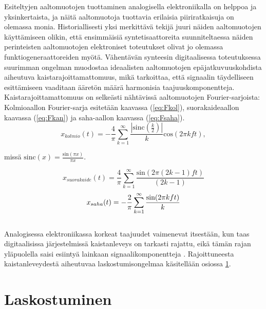 \documentclass[finnish,12pt,a4paper,pdftex]{article} %
\begin{document}
Esiteltyjen aaltomuotojen tuottaminen analogisella elektroniikalla on helppoa ja yksinkertaista, ja näitä aaltomuotoja tuottavia erilaisia piiriratkaisuja on olemassa monia. Historiallisesti yksi merkittävä tekijä juuri näiden aaltomuotojen käyttämiseen olikin, että ensimmäisiä syntetisaattoreita suunniteltaessa näiden perinteisten aaltomuotojen elektroniset toteutukset olivat jo olemassa funktiogeneraattoreiden myötä. Vähentävän synteesin digitaalisessa toteutuksessa suurimman ongelman muodostaa ideaalisten aaltomuotojen epäjatkuvuuskohdista aiheutuva kaistarajoittamattomuus, mikä tarkoittaa, että signaalin täydelliseen esittämiseen vaaditaan ääretön määrä harmonisia taajuuskomponentteja. Kaistarajoittamattomuus on selkeästi nähtävissä aaltomuotojen Fourier-sarjoista: Kolmioaallon Fourier-sarja esitetään kaavassa (\ref{eq:Fkol}), suorakaideaallon kaavassa (\ref{eq:Fkan}) ja saha-aallon kaavassa (\ref{eq:Fsaha}). \cite{Pekonen2014, Lehtonen2012} \\
\vspace{2mm}
\begin{equation} \label{eq:Fkol}
x_{kolmio}(t) = -\frac{4}{\pi}\sum_{k=1}^{\infty}\frac{|\textrm{sinc}(\frac{k}{2})|}{k}\textrm{cos}(2 \pi k f t), 
\end{equation}
\begin{center}
missä $ \textrm{sinc}(x) = \frac{\textrm{sin}(\pi x)}{\pi x}$. \\
\end{center}
\vspace{3mm}
\begin{equation} \label{eq:Fkan}
x_{suorakaide}(t) = \frac{4}{\pi}\sum_{k=1}^{\infty}\frac{\textrm{sin}(2 \pi (2k-1) f t)}{(2k-1)}
\end{equation}
\vspace{3mm}
\begin{equation} \label{eq:Fsaha}
x_{saha}(t) = -\frac{2}{\pi}\sum_{k=1}^{\infty}\frac{\textrm{sin}(2 \pi k f t)}{k} \vspace{3mm}
\end{equation}
\\
Analogisessa elektroniikassa korkeat taajuudet vaimenevat itsestään, kun taas digitaalisissa järjestelmissä kaistanleveys on tarkasti rajattu, eikä tämän rajan yläpuolella saisi esiintyä lainkaan signaalikomponentteja \cite{Pekonen2014}. Rajoittuneesta kaistanleveydestä aiheutuvaa laskostumisongelmaa käsitellään osiossa \ref{sec:laskostuminen}. 

\clearpage

\section{Laskostuminen} \label{sec:laskostuminen}
\end{document}
